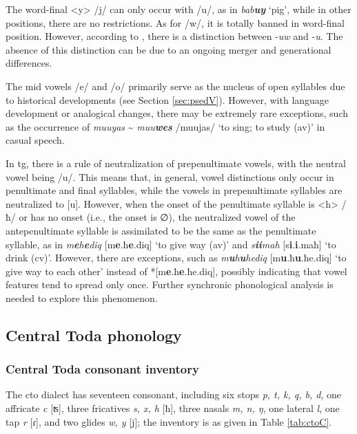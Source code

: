 The word-final <y> /j/ can only occur with /u/, as in \textit{bab\textbf{uy}} `pig', while in other positions, there are no restrictions. As for /w/, it is totally banned in word-final position. However, according to \textcite{yang1976sedpho}, there is a distinction between -\textit{uw} and -\textit{u}. The absence of this distinction can be due to an ongoing merger and generational differences.

The mid vowels /e/ and /o/ primarily serve as the nucleus of open syllables due to historical developments (see Section \ref{sec:psedV}). However, with language development or analogical changes, there may be extremely rare exceptions, such as the occurrence of \textit{muuyas} \~{} \textit{muu\textbf{wes}} /muujas/ `to sing; to study (\acs{av})' in casual speech.

In \acl{tg}, there is a rule of neutralization of prepenultimate vowels, with the neutral vowel being /u/. This means that, in general, vowel distinctions only occur in penultimate and final syllables, while the vowels in prepenultimate syllables are neutralized to [u]. However, when the onset of the penultimate syllable is <h> /ħ/ or has no onset (i.e., the onset is ∅), the neutralized vowel of the antepenultimate syllable is assimilated to be the same as the penultimate syllable, as in \textit{m\textbf{e}h\textbf{e}diq} [m\textbf{e}.ħ\textbf{e}.diq] `to give way (\acs{av})' and \textit{s\textbf{ii}mah} [s\textbf{i}.\textbf{i}.maħ] `to drink (\acs{cv})'. However, there are exceptions, such as \textit{m\textbf{u}h\textbf{u}hediq} [m\textbf{u}.ħ\textbf{u}.ħe.diq] `to give way to each other' instead of *[m\textbf{e}.ħ\textbf{e}.ħe.diq], possibly indicating that vowel features tend to spread only once. Further synchronic phonological analysis is needed to explore this phenomenon.


\subsection{Central Toda phonology}

\subsubsection{Central Toda consonant inventory}

The \acl{cto} dialect has seventeen consonant, including six stops \textit{p, t, k, q, b, d}, one affricate \textit{c} [ʦ], three fricatives \textit{s, x, h} [ħ], three nasals \textit{m, n, ŋ}, one lateral \textit{l}, one tap \textit{r} [ɾ], and two glides \textit{w, y} [j]; the inventory is as given in Table \ref{tab:ctoC}.

